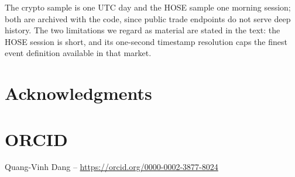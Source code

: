 \documentclass{ws-ijtaf}
\begin{document}
The crypto sample is one UTC day and the HOSE sample one morning session; both
are archived with the code, since public trade endpoints do not serve deep
history. The two limitations we regard as material are stated in the text: the
HOSE session is short, and its one-second timestamp resolution caps the finest
event definition available in that market.

\section*{Acknowledgments}

\section*{ORCID}

\noindent Quang-Vinh Dang -- \url{https://orcid.org/0000-0002-3877-8024}
\end{document}
